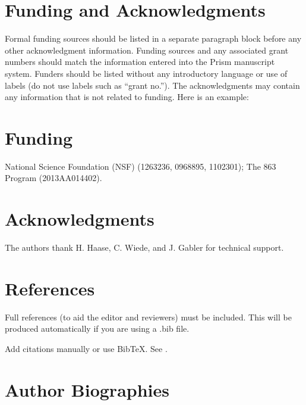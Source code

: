 \documentclass[9pt,twocolumn,twoside]{osajnl}
\begin{document}
\section{Funding and Acknowledgments}

Formal funding sources should be listed in a separate paragraph block before any other acknowledgment information. Funding sources and any associated grant numbers should match the information entered into the Prism manuscript system. Funders should be listed without any introductory language or use of labels (do not use labels such as “grant no.”). The acknowledgments may contain any information that is not related to funding. Here is an example:

\section*{Funding}National Science Foundation (NSF) (1263236, 0968895, 1102301); The 863 Program (2013AA014402).


\section*{Acknowledgments}The authors thank H. Haase, C. Wiede, and J. Gabler for technical support.

\section{References}

Full references (to aid the editor and reviewers) must be included. This will be produced automatically if you are using a .bib file.

\bigskip
\noindent Add citations manually or use BibTeX. See \cite{Chitimalla:17,Wen:16}.








 \section*{Author Biographies}
\end{document}

